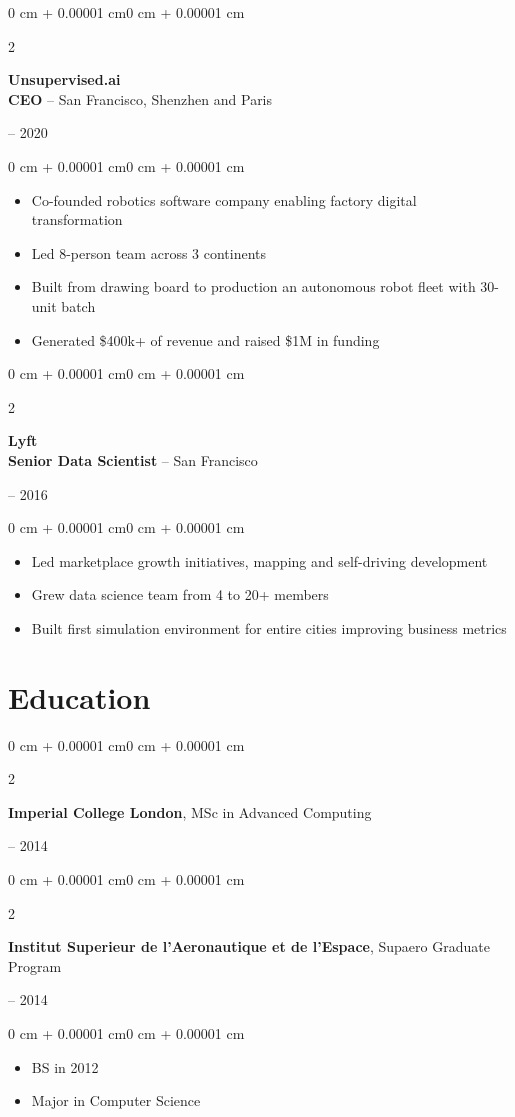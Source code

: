 \documentclass[10pt, letterpaper]{article}
\newenvironment{highlights}{
    \begin{itemize}[
        topsep=0.10 cm,
        parsep=0.10 cm,
        partopsep=0pt,
        itemsep=0pt,
        leftmargin=0 cm + 10pt
    ]
}{
    \end{itemize}
}
\newenvironment{onecolentry}{
    \begin{adjustwidth}{0 cm + 0.00001 cm}{0 cm + 0.00001 cm}
}{
    \end{adjustwidth}
}
\newenvironment{twocolentry}[2][]{
    \onecolentry
    \def\secondColumn{#2}
    \setcolumnwidth{\fill, 4.5 cm}
    \begin{paracol}{2}
}{
    \switchcolumn \raggedleft \secondColumn
    \end{paracol}
    \endonecolentry
}
\begin{document}
    \begin{twocolentry}{2016 -- 2020}
        \textbf{Unsupervised.ai} \\
        \textbf{CEO} -- San Francisco, Shenzhen and Paris
    \end{twocolentry}
    \begin{onecolentry}
        \begin{highlights}
            \item Co-founded robotics software company enabling factory digital transformation
            \item Led 8-person team across 3 continents
            \item Built from drawing board to production an autonomous robot fleet with 30-unit batch
            \item Generated \$400k+ of revenue and raised \$1M in funding
        \end{highlights}
    \end{onecolentry}

    \vspace{0.5cm}

    \begin{twocolentry}{2014 -- 2016}
        \textbf{Lyft} \\
        \textbf{Senior Data Scientist} -- San Francisco
    \end{twocolentry}
    \begin{onecolentry}
        \begin{highlights}
            \item Led marketplace growth initiatives, mapping and self-driving development
            \item Grew data science team from 4 to 20+ members
            \item Built first simulation environment for entire cities improving business metrics
        \end{highlights}
    \end{onecolentry}

    \section{Education}
    \begin{twocolentry}{2013 -- 2014}
        \textbf{Imperial College London}, MSc in Advanced Computing
    \end{twocolentry}

    \begin{twocolentry}{2011 -- 2014}
        \textbf{Institut Superieur de l'Aeronautique et de l'Espace}, Supaero Graduate Program
    \end{twocolentry}
    \begin{onecolentry}
        \begin{highlights}
            \item BS in 2012
            \item Major in Computer Science
        \end{highlights}
    \end{onecolentry}
\end{document}
